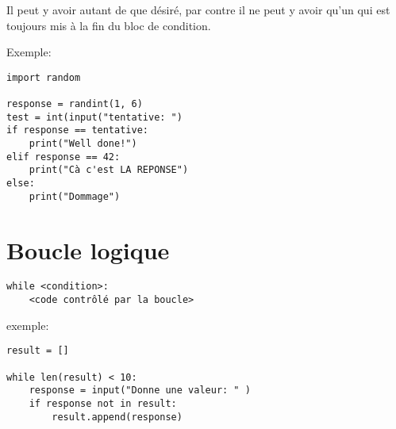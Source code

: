 \documentclass[10pt,a4paper,landscape]{article}
\begin{document}
\begin{multicols}{2}
Il peut y avoir autant de  que désiré, par contre il ne peut y avoir qu'un  qui est toujours mis à la fin du bloc de condition.

Exemple:

\begin{lstlisting}
import random

response = randint(1, 6)
test = int(input("tentative: ")
if response == tentative:
	print("Well done!")
elif response == 42:
	print("Cà c'est LA REPONSE")
else:
	print("Dommage")
\end{lstlisting}


\section{Boucle logique}

\begin{lstlisting}
while <condition>:
	<code contrôlé par la boucle>
\end{lstlisting}


{\normalsize exemple:}
\begin{lstlisting}
result = []
 
while len(result) < 10:
	response = input("Donne une valeur: " )
	if response not in result:	
		result.append(response)
\end{lstlisting}

\end{multicols}
\end{document}
